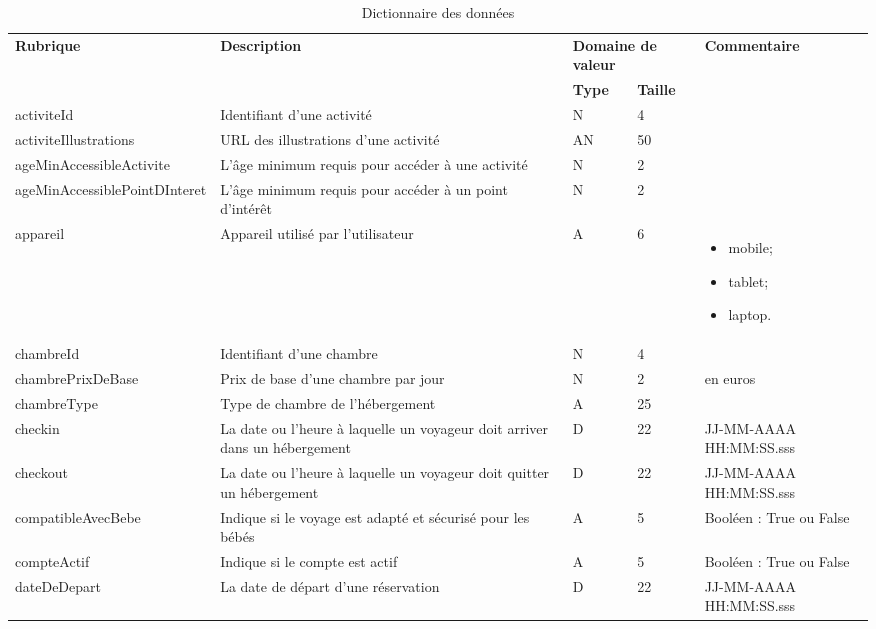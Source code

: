 \documentclass[12pt]{report}
\begin{document}
				\begin{longtable}{|p{4cm}|p{4cm}|p{1cm}|p{1cm}|p{4cm}|} 
				\caption{Dictionnaire des données} 
				\label{tab:DictDonnees}\\ 
				\hline 
				\textbf{Rubrique} & \textbf{Description} & \multicolumn{2}{|p{2cm}|}{\textbf{Domaine de valeur}} & \textbf{Commentaire} \\ \cline{3-4} 
				& & \textbf{Type} & \textbf{Taille} & \\ 
				\hline 
				\endfirsthead 	
				\endhead
				
				activiteId & Identifiant d'une activité & N & 4 & \\						
				\hline
				activiteIllustrations & URL des illustrations d'une activité & AN & 50 & \\						
				\hline
				ageMinAccessibleActivite & L'âge minimum requis pour accéder à une activité & N & 2 & \\						
				\hline
				ageMinAccessiblePointDInteret & L'âge minimum requis pour accéder à un point d'intérêt & N & 2 & \\						
				\hline
				appareil & Appareil utilisé par l'utilisateur & A & 6 & \begin{itemize} \item mobile; \item tablet; \item laptop. \end{itemize} \\						
				\hline
				chambreId & Identifiant d'une chambre & N & 4 & \\						
				\hline
				chambrePrixDeBase & Prix de base d'une chambre par jour & N & 2 & en euros \\						
				\hline
				chambreType & Type de chambre de l'hébergement & A & 25 & \\						
				\hline
				checkin & La date ou l'heure à laquelle un voyageur doit arriver dans un hébergement & D & 22 & JJ-MM-AAAA HH:MM:SS.sss \\						
				\hline
				checkout & La date ou l'heure à laquelle un voyageur doit quitter un hébergement & D & 22 & JJ-MM-AAAA HH:MM:SS.sss \\						
				\hline
				compatibleAvecBebe & Indique si le voyage est adapté et sécurisé pour les bébés & A & 5 & Booléen : True ou False \\						
				\hline
				compteActif & Indique si le compte est actif & A & 5 & Booléen : True ou False \\						
				\hline
				dateDeDepart & La date de départ d'une réservation & D & 22 & JJ-MM-AAAA HH:MM:SS.sss \\						

\end{longtable}
\end{document}

